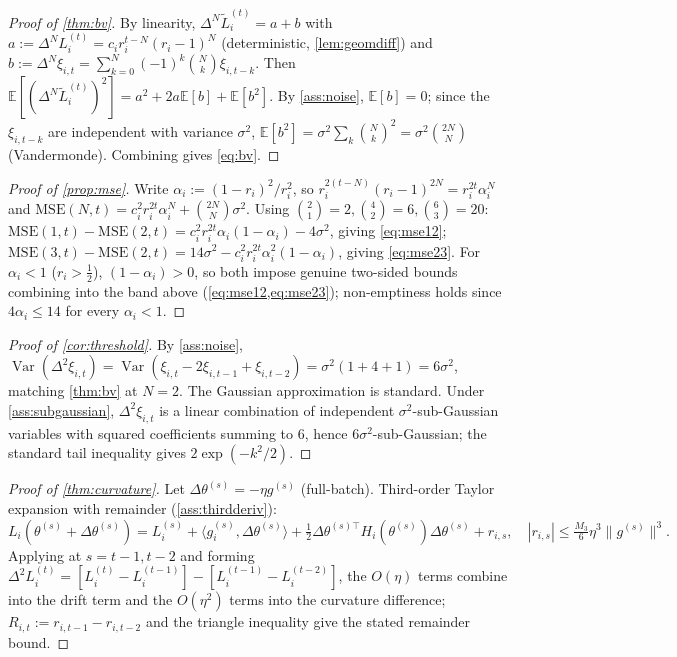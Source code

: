 \documentclass{article}
\theoremstyle{plain}
\theoremstyle{definition}
\theoremstyle{remark}
\DeclareMathOperator{\Var}{Var}
\begin{document}
\begin{proof}[Proof of \cref{thm:bv}]
By linearity, $\Delta^N\tilde L_i^{(t)} = a+b$ with $a:=\Delta^N L_i^{(t)} = c_i r_i^{t-N}(r_i-1)^N$ (deterministic, \cref{lem:geomdiff}) and $b:=\Delta^N\xi_{i,t} = \sum_{k=0}^N(-1)^k\binom Nk\xi_{i,t-k}$. Then $\mathbb E[(\Delta^N\tilde L_i^{(t)})^2] = a^2 + 2a\mathbb E[b] + \mathbb E[b^2]$. By \cref{ass:noise}, $\mathbb E[b]=0$; since the $\xi_{i,t-k}$ are independent with variance $\sigma^2$, $\mathbb E[b^2] = \sigma^2\sum_k\binom Nk^2 = \sigma^2\binom{2N}N$ (Vandermonde). Combining gives \cref{eq:bv}.
\end{proof}

\begin{proof}[Proof of \cref{prop:mse}]
Write $\alpha_i := (1-r_i)^2/r_i^2$, so $r_i^{2(t-N)}(r_i-1)^{2N} = r_i^{2t}\alpha_i^N$ and $\mathrm{MSE}(N,t) = c_i^2 r_i^{2t}\alpha_i^N + \binom{2N}N\sigma^2$. Using $\binom21=2,\binom42=6,\binom63=20$:
$\mathrm{MSE}(1,t)-\mathrm{MSE}(2,t) = c_i^2r_i^{2t}\alpha_i(1-\alpha_i)-4\sigma^2$, giving \cref{eq:mse12}; $\mathrm{MSE}(3,t)-\mathrm{MSE}(2,t) = 14\sigma^2 - c_i^2r_i^{2t}\alpha_i^2(1-\alpha_i)$, giving \cref{eq:mse23}. For $\alpha_i<1$ ($r_i>\tfrac12$), $(1-\alpha_i)>0$, so both impose genuine two-sided bounds combining into the band above (\cref{eq:mse12,eq:mse23}); non-emptiness holds since $4\alpha_i\le14$ for every $\alpha_i<1$.
\end{proof}

\begin{proof}[Proof of \cref{cor:threshold}]
By \cref{ass:noise}, $\Var(\Delta^2\xi_{i,t}) = \Var(\xi_{i,t}-2\xi_{i,t-1}+\xi_{i,t-2}) = \sigma^2(1+4+1) = 6\sigma^2$, matching \cref{thm:bv} at $N=2$. The Gaussian approximation is standard. Under \cref{ass:subgaussian}, $\Delta^2\xi_{i,t}$ is a linear combination of independent $\sigma^2$-sub-Gaussian variables with squared coefficients summing to $6$, hence $6\sigma^2$-sub-Gaussian; the standard tail inequality gives $2\exp(-k^2/2)$.
\end{proof}

\begin{proof}[Proof of \cref{thm:curvature}]
Let $\Delta\theta^{(s)}=-\eta g^{(s)}$ (full-batch). Third-order Taylor expansion with remainder (\cref{ass:thirdderiv}):
\[
L_i(\theta^{(s)}+\Delta\theta^{(s)}) = L_i^{(s)} + \langle g_i^{(s)},\Delta\theta^{(s)}\rangle + \tfrac12\Delta\theta^{(s)\top}H_i(\theta^{(s)})\Delta\theta^{(s)} + r_{i,s}, \quad |r_{i,s}|\le\tfrac{M_3}6\eta^3\|g^{(s)}\|^3.
\]
Applying at $s=t-1,t-2$ and forming $\Delta^2 L_i^{(t)} = [L_i^{(t)}-L_i^{(t-1)}]-[L_i^{(t-1)}-L_i^{(t-2)}]$, the $O(\eta)$ terms combine into the drift term and the $O(\eta^2)$ terms into the curvature difference; $R_{i,t}:=r_{i,t-1}-r_{i,t-2}$ and the triangle inequality give the stated remainder bound.
\end{proof}
\end{document}
